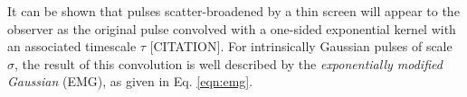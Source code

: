 \documentclass[preprint2,linenumbers]{aastex631}
\begin{document}
%






\appendix

It can be shown that pulses scatter-broadened by a thin screen will appear to the observer as the original pulse convolved with a one-sided exponential kernel with an associated timescale $\tau$ [CITATION].
For intrinsically Gaussian pulses of scale $\sigma$, the result of this convolution is well described by the \textit{exponentially modified Gaussian} (EMG), as given in Eq. \eqref{eqn:emg}.
\end{document}
